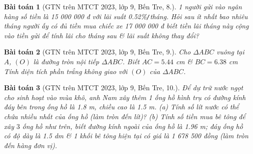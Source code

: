 \documentclass{article}
\newtheorem{baitoan}{Bài toán}
\begin{document}
\begin{baitoan}[GTN trên MTCT 2023, lớp 9, Bến Tre, 8.]
	1 người gửi vào ngân hàng số tiền là \emph{15 000 000 đ} với lãi suất \emph{0.52\%\texttt{/}tháng}. Hỏi sau ít nhất bao nhiêu tháng người ấy có đủ tiền mua chiếc xe \emph{17 000 000 đ} biết tiền lãi tháng này cộng vào tiền gửi để tính lãi cho tháng sau \& lãi suất không thay đổi? 
\end{baitoan}

\begin{baitoan}[GTN trên MTCT 2023, lớp 9, Bến Tre, 9.]
	Cho $\Delta ABC$ vuông tại $A$, $(O)$ là đường tròn nội tiếp $\Delta ABC$. Biết $AC = 5.44$ \emph{cm} \& $BC = 6.38$ \emph{cm} Tính diện tích phần trắng không giao với $(O)$ của $\Delta ABC$.
\end{baitoan}

\begin{baitoan}[GTN trên MTCT 2023, lớp 9, Bến Tre, 10.]
	Để dự trữ nước ngọt cho sinh hoạt vào mùa khô, anh Nam xây thêm 1 ống hồ hình trụ có đường kính đáy bên trong ống hồ là \emph{1.8 m}, chiều cao là \emph{1.5 m}. (a) Tính số lít nước có thể chứa nhiều nhất của ống hồ (làm tròn đến lít)? (b) Tính số tiền mua bê tông để xây $3$ ống hồ như trên, biết đường kính ngoài của ống hồ là \emph{1.96 m}; đáy ống hồ có độ dày là \emph{1.5 dm} \& 1 khối bê tông hiện tại có giá là \emph{1 678 500 đồng} (làm tròn đến hàng đơn vị).
\end{baitoan}


\printbibliography[heading=bibintoc]
	
\end{document}
